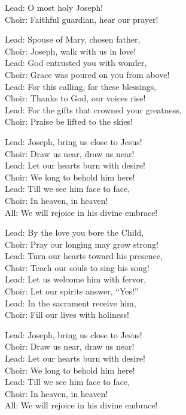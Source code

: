 \begin{lyrics}
Lead: O most holy Joseph!\\
Choir: Faithful guardian, hear our prayer!

Lead: Spouse of Mary, chosen father,\\
Choir: Joseph, walk with us in love!\\
Lead: God entrusted you with wonder,\\
Choir: Grace was poured on you from above!\\
Lead: For this calling, for these blessings,\\
Choir: Thanks to God, our voices rise!\\
Lead: For the gifts that crowned your greatness,\\
Choir: Praise be lifted to the skies!

Lead: Joseph, bring us close to Jesus!\\
Choir: Draw us near, draw us near!\\
Lead: Let our hearts burn with desire!\\
Choir: We long to behold him here!\\
Lead: Till we see him face to face,\\
Choir: In heaven, in heaven!\\
All: We will rejoice in his divine embrace!

Lead: By the love you bore the Child,\\
Choir: Pray our longing may grow strong!\\
Lead: Turn our hearts toward his presence,\\
Choir: Teach our souls to sing his song!\\
Lead: Let us welcome him with fervor,\\
Choir: Let our spirits answer, “Yes!”\\
Lead: In the sacrament receive him,\\
Choir: Fill our lives with holiness!

Lead: Joseph, bring us close to Jesus!\\
Choir: Draw us near, draw us near!\\
Lead: Let our hearts burn with desire!\\
Choir: We long to behold him here!\\
Lead: Till we see him face to face,\\
Choir: In heaven, in heaven!\\
All: We will rejoice in his divine embrace!


\end{lyrics}
